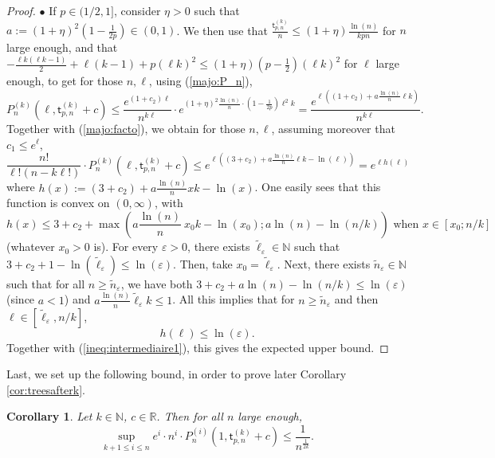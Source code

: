 \documentclass[a4, 11pt]{article}
\numberwithin{equation}{section}
\theoremstyle{plain}
\newtheorem{corollary}[theorem]{Corollary}
\theoremstyle{definition}
\theoremstyle{remark}
\begin{document}
\begin{proof}
$\bullet$ If $p\in (1/2,1]$, consider $\eta>0$ such that $a:=(1+\eta)^2(1-\frac{1}{2p}) \in (0,1)$. We then use that $\frac{\mathsf t^{(k)}_{p,n}}{n} \leq (1+\eta) \frac{\ln(n)}{kpn}$ for $n$ large enough, and that $-\frac{\ell k(\ell k-1)}{2}+\ell(k-1)+p(\ell k)^2\leq (1+\eta) (p-\frac{1}{2}) (\ell k)^2$ for $\ell$ large enough, to get for those $n,\ell$, using (\ref{majo:P_n}),
$$
P_n^{(k)}(\ell,\mathsf t^{(k)}_{p,n}+c) \leq \frac{e^{(1+c_2) \ell}}{n^{k\ell}} \cdot e^{ (1+\eta)^2 \frac{\ln(n)}{n} \cdot (1-\frac{1}{2p}) \ell^2 k}=\frac{e^{\ell \left((1+c_2)+a\frac{\ln(n)}{n} \ell k\right)}}{n^{k\ell}}.
$$
Together with (\ref{majo:facto}), we obtain for those $n,\ell$, assuming moreover that $c_1 \leq e^{\ell}$,
\begin{equation}
\label{ineq:intermediaire1}
\frac{n!}{\ell ! (n-k\ell !)} \cdot P_n^{(k)}(\ell,\mathsf t^{(k)}_{p,n}+c) \leq e^{\ell \left((3+c_2)+a\frac{\ln(n)}{n}\ell k-\ln(\ell) \right)}=e^{\ell h(\ell)}
\end{equation}
where $h(x):=(3+c_2)+a\frac{\ln(n)}{n}x k-\ln(x)$. One easily sees that this function is convex on $(0,\infty)$, with
$$
h(x) \leq 3+c_2+\max \left(a \frac{\ln(n)}{n}\ x_0k-\ln(x_0); a \ln(n)-\ln(n/k) \right) \text{ when } x \in [x_0 ; n/k]
$$
(whatever $x_0>0$ is).
For every $\varepsilon>0$, there exists $\tilde \ell_{\varepsilon} \in \mathbb N$ such that $3+c_2+1-\ln(\tilde \ell_{\varepsilon}) \leq \ln(\varepsilon)$. Then, take $x_0 =\tilde \ell_{\varepsilon}$.  Next,
there exists $\tilde n_{\varepsilon} \in \mathbb N$ such that for all $n \geq \tilde n_{\varepsilon}$, we have both $3+c_2+a \ln(n)-\ln(n/k) \leq \ln(\varepsilon)$ (since $a<1$) and $a \frac{\ln(n)}{n} \tilde \ell_{\varepsilon} k\leq 1$. All this implies that for $n \geq \tilde n_{\varepsilon}$ and then $\ell \in [\tilde \ell_{\varepsilon},n/k]$,
$$
h(\ell) \leq \ln(\varepsilon).
$$
Together with (\ref{ineq:intermediaire1}), this gives the expected upper bound.
\end{proof}

\bigskip

Last, we set up the following bound, in order to prove later Corollary \ref{cor:treesafterk}.

\bigskip

\begin{corollary}
\label{cor:unifbound}
Let $k\in \mathbb N$, $c \in \mathbb R$. 
Then for all $n$ large enough,
$$
\sup_{k+1 \leq i\leq n} e^{i} \cdot n^i \cdot P_n^{(i)}(1,\mathsf t^{(k)}_{p,n}+c) \leq \frac{1}{n^{\frac{1}{2k}}}.
$$
\end{corollary}
\end{document}
